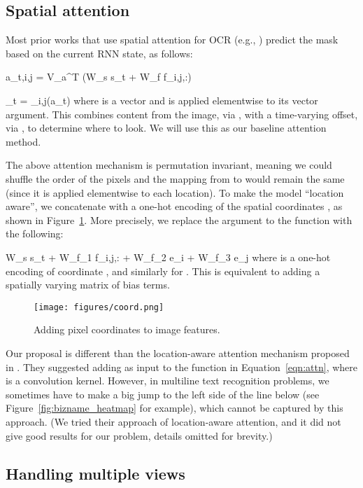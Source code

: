 \documentclass[conference]{IEEEtran}
\newcommand{\be}{}
\begin{document}
\subsection{Spatial attention}
\label{sec:attn}

Most prior works that use spatial attention for OCR
(e.g., \cite{lee2016recursive,shi2015end,shi2016robust,he2016text, bluche2016scan, bluche2016joint})
predict the mask based on the current RNN state, as follows:
\be
a_{t,i,j} = V_a^T \tanh(W_s s_t + W_f f_{i,j,:})
\label{eqn:attn}
\ee
\be
\alpha_t = _{i,j}(a_t)
\label{eqn:attn2}
\ee
where  is a vector and  is applied elementwise to its vector argument.
This combines content from the image, via , with a time-varying
offset, via , to determine where to look.
We will use this as our baseline attention method.


The above attention mechanism is permutation invariant, meaning we
could shuffle the order of the pixels and the mapping from  to
 would remain the same (since it is applied elementwise to
each location). To make the model ``location aware'', we concatenate
 with a one-hot encoding of the spatial coordinates
,
as shown in  Figure~\ref{fig:coord}.
More precisely,
we replace the argument to the  function with the following:
\be
W_s s_t + W_{f_1} f_{i,j,:}  + W_{f_2}  e_i + W_{f_3}  e_j
\ee
where  is a one-hot encoding of coordinate ,
and similarly for .
This is equivalent to adding a spatially varying matrix of bias terms.


\begin{figure}
\begin{center}
\texttt{[image: figures/coord.png]}
\caption{Adding pixel coordinates to image features.}
\label{fig:coord}
\end{center}
\end{figure}


Our proposal is different than the location-aware attention mechanism
proposed in \cite{chorowski2015attention}. They suggested adding
 as input to the  function in
Equation~\ref{eqn:attn}, where  is a convolution
kernel. However, in multiline text recognition problems, we sometimes
have to make a big jump to the left side of the line below
(see Figure~\ref{fig:bizname_heatmap} for example),
which cannot be captured by this approach.
(We tried their approach of location-aware attention, and it did not give good results for our problem, details omitted for brevity.)

\subsection{Handling multiple views}
\end{document}

